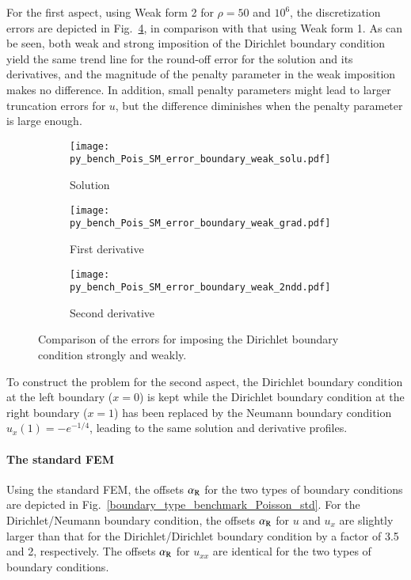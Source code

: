 \documentclass[review,3p]{elsarticle}
\begin{document}
For the first aspect, using Weak form 2 for $\rho=50$ and $10^6$, the discretization errors are depicted in Fig.~\ref{py_bench_Pois_SM_error_boundary_weak}, in comparison with that using Weak form 1. As can be seen, both weak and strong imposition of the Dirichlet boundary condition yield the same trend line for the round-off error for the solution and its derivatives, and the magnitude of the penalty parameter in the weak imposition makes no difference. In addition, small penalty parameters might lead to larger truncation errors for $u$, but the difference diminishes when the penalty parameter is large enough.

\begin{figure}[!ht]
    \begin{subfigure}{5.5cm}
        \texttt{[image: py\_bench\_Pois\_SM\_error\_boundary\_weak\_solu.pdf]}
        \caption{Solution}
        \label{py_bench_Pois_SM_error_boundary_weak_solu}
    \end{subfigure}
    \hspace{-0.2cm}
    \begin{subfigure}{5.5cm}
        \texttt{[image: py\_bench\_Pois\_SM\_error\_boundary\_weak\_grad.pdf]}
        \caption{First derivative}
        \label{py_bench_Pois_SM_error_boundary_weak_grad}
    \end{subfigure}
    \hspace{-0.2cm}
    \begin{subfigure}{5.5cm}
        \texttt{[image: py\_bench\_Pois\_SM\_error\_boundary\_weak\_2ndd.pdf]}
        \caption{Second derivative}
        \label{py_bench_Pois_SM_error_boundary_weak_2ndd}
    \end{subfigure}
\caption{Comparison of the errors for imposing the Dirichlet boundary condition strongly and weakly.}
\label{py_bench_Pois_SM_error_boundary_weak}
\end{figure}

To construct the problem for the second aspect, the Dirichlet boundary condition at the left boundary ($x=0$) is kept while the Dirichlet boundary condition at the right boundary ($x=1$) has been replaced by the Neumann boundary condition $u_x (1) = -e^{-1/4}$, leading to the same solution and derivative profiles. 


\paragraph{The standard FEM}
Using the standard FEM, the offsets $\alpha_{\rm R}$ for the two types of boundary conditions are depicted in Fig.~\ref{boundary_type_benchmark_Poisson_std}. 
For the Dirichlet/Neumann boundary condition, the offsets $\alpha_{\rm R}$ for $u$ and $u_x$ are slightly larger than that for the Dirichlet/Dirichlet boundary condition by a factor of 3.5 and 2, respectively. The offsets $\alpha_{\rm R}$ for $u_{xx}$ are identical for the two types of boundary conditions.
\end{document}
